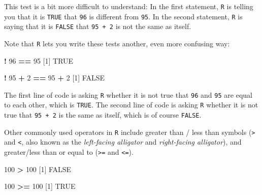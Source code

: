 \documentclass[
]{book}
\newenvironment{Shaded}{\begin{snugshade}}{\end{snugshade}}
\newcommand{\DecValTok}[1]{\textcolor[rgb]{0.00,0.00,0.81}{#1}}
\newcommand{\NormalTok}[1]{#1}
\newcommand{\OperatorTok}[1]{\textcolor[rgb]{0.81,0.36,0.00}{\textbf{#1}}}
\newcommand{\OtherTok}[1]{\textcolor[rgb]{0.56,0.35,0.01}{#1}}
\newcommand{\StringTok}[1]{\textcolor[rgb]{0.31,0.60,0.02}{#1}}
\begin{document}
This test is a bit more difficult to understand: In the first statement, \texttt{R} is telling you that it is \texttt{TRUE} that \texttt{96} is different from \texttt{95}. In the second statement, \texttt{R} is saying that it is \texttt{FALSE} that \texttt{95\ +\ 2} is not the same as itself.

Note that \texttt{R} lets you write these tests another, even more confusing way:

\begin{Shaded}
\begin{Highlighting}[]
\OperatorTok{!}\StringTok{ }\DecValTok{96} \OperatorTok{==}\StringTok{ }\DecValTok{95}
\NormalTok{[}\DecValTok{1}\NormalTok{] }\OtherTok{TRUE}
\end{Highlighting}
\end{Shaded}

\begin{Shaded}
\begin{Highlighting}[]
\OperatorTok{!}\StringTok{ }\DecValTok{95} \OperatorTok{+}\StringTok{ }\DecValTok{2} \OperatorTok{==}\StringTok{ }\DecValTok{95} \OperatorTok{+}\StringTok{ }\DecValTok{2}
\NormalTok{[}\DecValTok{1}\NormalTok{] }\OtherTok{FALSE}
\end{Highlighting}
\end{Shaded}

The first line of code is asking \texttt{R} whether it is not true that \texttt{96} and \texttt{95} are equal to each other, which is \texttt{TRUE}. The second line of code is asking \texttt{R} whether it is not true that \texttt{95\ +\ 2} is the same as itself, which is of course \texttt{FALSE}.

Other commonly used operators in \texttt{R} include greater than / less than symbols (\texttt{\textgreater{}} and \texttt{\textless{}}, also known as the \emph{left-facing alligator} and \emph{right-facing alligator}), and greater/less than or equal to (\texttt{\textgreater{}=} and \texttt{\textless{}=}).

\begin{Shaded}
\begin{Highlighting}[]
\DecValTok{100} \OperatorTok{>}\StringTok{ }\DecValTok{100}
\NormalTok{[}\DecValTok{1}\NormalTok{] }\OtherTok{FALSE}
\end{Highlighting}
\end{Shaded}

\begin{Shaded}
\begin{Highlighting}[]
\DecValTok{100} \OperatorTok{>=}\StringTok{ }\DecValTok{100}
\NormalTok{[}\DecValTok{1}\NormalTok{] }\OtherTok{TRUE}
\end{Highlighting}
\end{Shaded}
\end{document}
